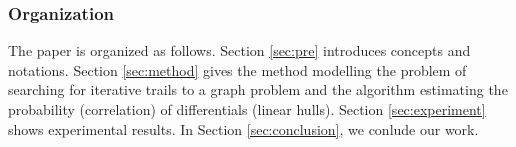 \subsubsection{Organization}
The paper is organized as follows. Section \ref{sec:pre} introduces concepts and notations. Section \ref{sec:method} gives the method modelling the problem of searching for iterative trails to a graph problem and the algorithm estimating the probability (correlation) of differentials (linear hulls). Section \ref{sec:experiment} shows experimental results. In Section \ref{sec:conclusion}, we conlude our work.
